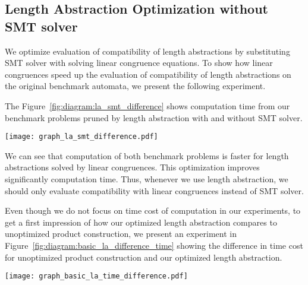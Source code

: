 \subsection{Length Abstraction Optimization without SMT solver}

We optimize evaluation of compatibility of length abstractions by substituting SMT solver with solving linear congruence equations. To show how linear congruences speed up the evaluation of compatibility of length abstractions on the original benchmark automata, we present the following experiment.

The Figure~\ref{fig:diagram:la_smt_difference} shows computation time from our benchmark problems pruned by length abstraction with and without SMT solver.

\begin{figure*}[ht]
	\centering
	\texttt{[image: graph\_la\_smt\_difference.pdf]}
	\caption{Comparison of time consumption of length abstraction evaluated by SMT solver and length abstraction evaluated without SMT solver, combining both benchmark problems. Both axes are in symmetrical logarithmic scale. They show time consumption in seconds: x-axis length abstraction evaluated by SMT solver, y-axis length abstraction evaluated without SMT solver.}
	\label{fig:diagram:la_smt_difference}
\end{figure*}

We can see that computation of both benchmark problems is faster for length abstractions solved by linear congruences. This optimization improves significantly computation time. Thus, whenever we use length abstraction, we should only evaluate compatibility with linear congruences instead of SMT solver.

Even though we do not focus on time cost of computation in our experiments, to get a first impression of how our optimized length abstraction compares to unoptimized product construction, we present an experiment in Figure~\ref{fig:diagram:basic_la_difference_time} showing the difference in time cost for unoptimized product construction and our optimized length abstraction.

\begin{figure*}[ht]
	\centering
	\texttt{[image: graph\_basic\_la\_time\_difference.pdf]}
	\caption{Comparison of time consumption of unoptimized product construction and length abstraction evaluated without SMT solver, combining both benchmark problems. Both axes are in symmetrical logarithmic scale. They show time cost in seconds: x-axis unoptimized product construction, y-axis length abstraction evaluated without SMT solver.}
	\label{fig:diagram:basic_la_difference_time}
\end{figure*}

